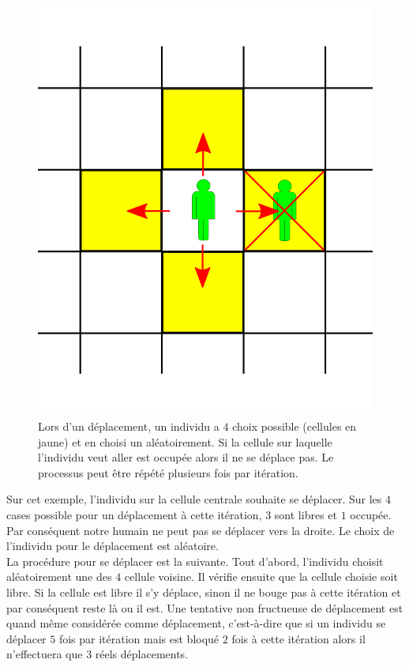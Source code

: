 \begin{figure}[h]
	\centering
	\captionsetup{justification=centering}
	\includegraphics[scale=0.5]{Images/move_available.png}
	\caption[Mouvements des individus]{Lors d'un déplacement, un individu a $4$ choix possible (cellules en jaune) et en choisi un aléatoirement. Si la cellule sur laquelle l'individu veut aller est occupée alors il ne se déplace pas. Le processus peut être répété plusieurs fois par itération.}
\end{figure}

Sur cet exemple, l'individu sur la cellule centrale souhaite se déplacer. Sur les $4$ cases possible pour un déplacement à cette itération, $3$ sont libres et $1$ occupée. Par conséquent notre humain ne peut pas se déplacer vers la droite. Le choix de l'individu pour le déplacement est aléatoire.\\

La procédure pour se déplacer est la suivante. Tout d'abord, l'individu choisit aléatoirement une des $4$ cellule voisine. Il vérifie ensuite que la cellule choisie soit libre. Si la cellule est libre il s'y déplace, sinon il ne bouge pas à cette itération et par conséquent reste là ou il est. Une tentative non fructueuse de déplacement est quand même considérée comme déplacement, c'est-à-dire que si un individu se déplacer $5$ fois par itération mais est bloqué $2$ fois à cette itération alors il n'effectuera que $3$ réels déplacements.

